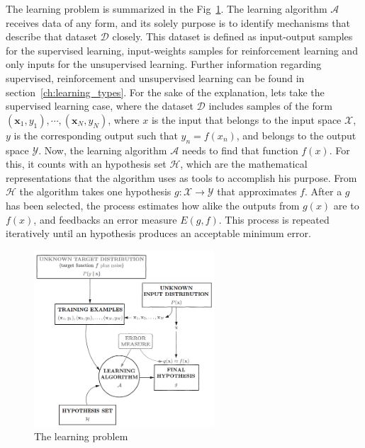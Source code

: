 The learning problem is summarized in the Fig~\ref{fig:learning_problem}. The learning algorithm  \( \mathcal{A} \) receives data of any form, and its solely purpose is to identify mechanisms that describe that dataset  \( \mathcal{D} \) closely. This dataset is defined as input-output samples for the supervised learning, input-weights samples for reinforcement learning and only inputs for the unsupervised learning. Further information regarding supervised, reinforcement and unsupervised learning can be found in section~\ref{ch:learning_types}. For the sake of the explanation, lets take the supervised learning case, where the dataset  \( \mathcal{D} \) includes samples of the form \( (\mathbf{x}_1, y_1),\cdots , (\mathbf{x}_N, y_N) \), where \(x\) is the input that belongs to the input space \( \mathcal{X} \), \(y\) is the corresponding output such that \(y_n = f(x_n)\), and belongs to the output space \( \mathcal{Y}\). Now, the learning algorithm \( \mathcal{A} \) needs to find that function \(f(x)\). For this, it counts with an hypothesis set \( \mathcal{H} \), which are the mathematical representations that the algorithm uses as tools to accomplish his purpose. From \( \mathcal{H} \) the algorithm takes one hypothesis \( g:\mathcal{ X \rightarrow Y} \) that approximates \(f\). After a \(g\) has been selected, the process estimates how alike the outputs from \(g(x)\) are to \(f(x)\), and feedbacks an error measure \(E(g,f)\). This process is repeated iteratively until an hypothesis produces an acceptable minimum error. \\

\begin{figure}[htb]
    \centering
      \includegraphics[width=0.6\textwidth]{figures/learning_problem.png}
      \caption{The learning problem \cite{Yaser}}
      \label{fig:learning_problem}
\end{figure}

